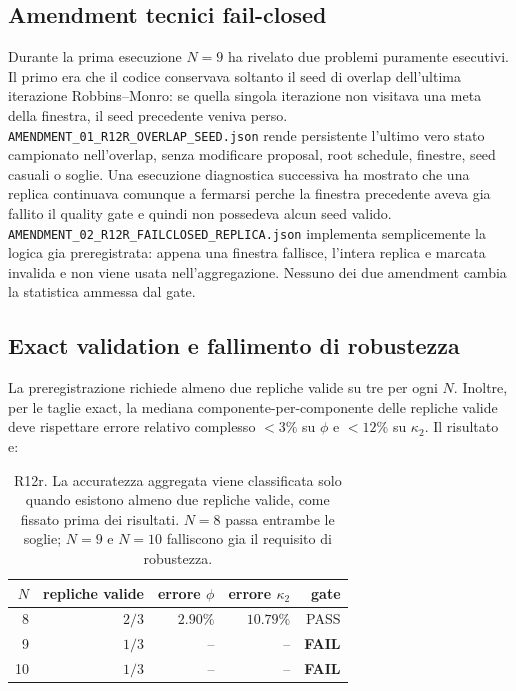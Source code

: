 \documentclass[11pt,a4paper]{article}
\begin{document}
\subsection{Amendment tecnici fail-closed}

Durante la prima esecuzione $N=9$ ha rivelato due problemi puramente esecutivi. Il primo era che il codice conservava soltanto il seed di overlap dell'ultima iterazione Robbins--Monro: se quella singola iterazione non visitava una meta della finestra, il seed precedente veniva perso. \texttt{AMENDMENT\_01\_R12R\_OVERLAP\_SEED.json} rende persistente l'ultimo vero stato campionato nell'overlap, senza modificare proposal, root schedule, finestre, seed casuali o soglie. Una esecuzione diagnostica successiva ha mostrato che una replica continuava comunque a fermarsi perche la finestra precedente aveva gia fallito il quality gate e quindi non possedeva alcun seed valido. \texttt{AMENDMENT\_02\_R12R\_FAILCLOSED\_REPLICA.json} implementa semplicemente la logica gia preregistrata: appena una finestra fallisce, l'intera replica e marcata invalida e non viene usata nell'aggregazione. Nessuno dei due amendment cambia la statistica ammessa dal gate.

\subsection{Exact validation e fallimento di robustezza}

La preregistrazione richiede almeno due repliche valide su tre per ogni $N$. Inoltre, per le taglie exact, la mediana componente-per-componente delle repliche valide deve rispettare errore relativo complesso $<3\%$ su $\phi$ e $<12\%$ su $\kappa_2$. Il risultato e:

\begin{table}[htbp]
\centering
\small
\begin{tabular}{rrrrr}
\toprule
$N$ & repliche valide & errore $\phi$ & errore $\kappa_2$ & gate \\
\midrule
8  & $2/3$ & $2.90\%$ & $10.79\%$ & PASS \\
9  & $1/3$ & -- & -- & \textbf{FAIL} \\
10 & $1/3$ & -- & -- & \textbf{FAIL} \\
\bottomrule
\end{tabular}
\caption{R12r. La accuratezza aggregata viene classificata solo quando esistono almeno due repliche valide, come fissato prima dei risultati. $N=8$ passa entrambe le soglie; $N=9$ e $N=10$ falliscono gia il requisito di robustezza.}
\end{table}
\end{document}
